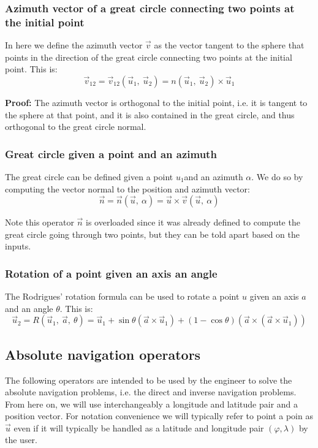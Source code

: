 \subsubsection{Azimuth vector of a great circle connecting two points at the initial point}
In here we define the azimuth vector $\vec{v}$ as the vector tangent to the sphere that points in the direction of the great circle connecting two points at the initial point. This is:
\begin{equation}
	\vec{v}_{12} = \vec{v}_{12} (\vec{u}_1, \ \vec{u}_2) = n(\vec{u}_1, \ \vec{u}_2) \times \vec{u}_1
\end{equation}

\textbf{{Proof:}}
The azimuth vector is orthogonal to the initial point, i.e. it is tangent to the sphere at that point, and it is also contained in the great circle, and thus orthogonal to the great circle normal.


\subsubsection{Great circle given a point and an azimuth}
The great circle can be defined given a point $u_1$and an azimuth $\alpha$. We do so by computing the vector normal to the position and azimuth vector:
\begin{equation}
	\vec{n} = \vec{n} (\vec{u}, \ \alpha) = \vec{u} \times \vec{v} (\vec{u}, \ \alpha)
\end{equation}

Note this operator $\vec{n}$ is overloaded since it was already defined to compute the great circle going through two points, but they can be told apart based on the inputs.

\subsubsection{Rotation of a point given an axis an angle}
The Rodrigues' rotation formula can be used to rotate a point $u$ given an axis $a$ and an angle $\theta$. This is:
\begin{equation}
	\vec{u}_2 = R(\vec{u}_1, \ \vec{a}, \ \theta) = \vec{u}_1 + \sin \theta (\vec{a} \times \vec{u}_1) + (1 - \cos \theta) (\vec{a} \times (\vec{a} \times \vec{u}_1))
\end{equation}

\subsection{Absolute navigation operators}
The following operators are intended to be used by the engineer to solve the absolute navigation problems, i.e. the direct and inverse navigation problems. From here on, we will use interchangeably a longitude and latitude pair and a position vector. For notation convenience we will typically refer to point a poin as $\vec{u}$ even if it will typically be handled as a latitude and longitude pair $(\varphi, \lambda)$ by the user.

